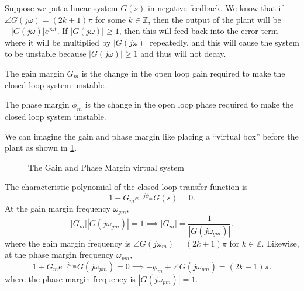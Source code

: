 Suppose we put a linear system $G(s)$ in negative feedback. 
We know that if $\angle G(j\omega) = (2k+1)\pi$ for some $k\in\mathbb{Z}$, then the output of the plant will be $-|G(j\omega)|e^{j\omega t}$.
If $|G(j\omega)| \geq 1$, then this will feed back into the error term where it will be multiplied by $|G(j\omega)|$ repeatedly, and this will cause the system to be unstable because $|G(j\omega)|\geq1$ and thus will not decay.
\begin{definition}
  The gain margin $G_m$ is the change in the open loop gain required to make the closed loop system unstable.
  \label{defn:gain-margin}
\end{definition}
\begin{definition}
  The phase margin $\phi_m$ is the change in the open loop phase required to make the closed loop system unstable.
  \label{defn:phase-margin}
\end{definition}
We can imagine the gain and phase margin like placing a ``virtual box'' before the plant as shown in \cref{fig:margin-controller}.
\begin{figure}[H]
    \centering 
    \caption{The Gain and Phase Margin virtual system}
    \label{fig:margin-controller}
\end{figure}
The characteristic polynomial of the closed loop transfer function is
\[
  1 + G_me^{-j\phi_m}G(s) = 0.
\]
At the gain margin frequency $\omega_{gm}$,
\[
  |G_m||G(j\omega_{gm})| = 1 \implies |G_m| = \frac{1}{|G(j\omega_{gm})|}.
\]
where the gain margin frequency is $\angle G(j\omega_m) = (2k+1)\pi$ for $k\in\mathbb{Z}$.
Likewise, at the phase margin frequency $\omega_{pm}$, 
\[
  1 + G_me^{-j\omega_m}G(j\omega_{pm}) = 0 \implies -\phi_m + \angle G(j\omega_{pm}) = (2k+1)\pi.
\]
where the phase margin frequency is $|G(j\omega_{pm})| = 1$.

